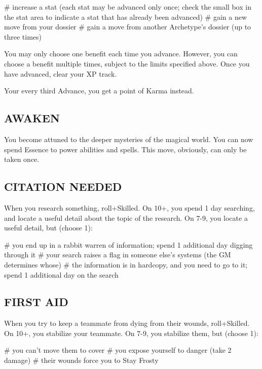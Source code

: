 \begin{easylist}
# increase a stat (each stat may be advanced only once; check the small box in the stat area to indicate a stat that has already been advanced)
# gain a new move from your dossier
# gain a move from another Archetype’s dossier (up to three times)
\end{easylist}

You may only choose one benefit each time you advance. However, you can choose a benefit multiple times, subject to the limits specified above. Once you have advanced, clear your XP track.

Your every third Advance, you get a point of Karma instead.


\subsection{AWAKEN}
You become attuned to the deeper mysteries of the magical world. You can now spend Essence to power abilities and spells. This move, obviously, can only be taken once.


\subsection{CITATION NEEDED}
When you research something, roll+Skilled. On 10+, you spend 1 day searching, and locate a useful detail about the topic of the research. On 7-9, you locate a useful detail, but (choose 1):

\begin{easylist}
# you end up in a rabbit warren of information; spend 1 additional day digging through it
# your search raises a flag in someone else’s systems (the GM determines whose)
# the information is in hardcopy, and you need to go to it; spend 1 additional day on the search
\end{easylist}


\subsection{FIRST AID}
When you try to keep a teammate from dying from their wounds, roll+Skilled. On 10+, you stabilize your teammate. On 7-9, you stabilize them, but (choose 1):

\begin{easylist}
# you can’t move them to cover
# you expose yourself to danger (take 2 damage)
# their wounds force you to Stay Frosty
\end{easylist}

